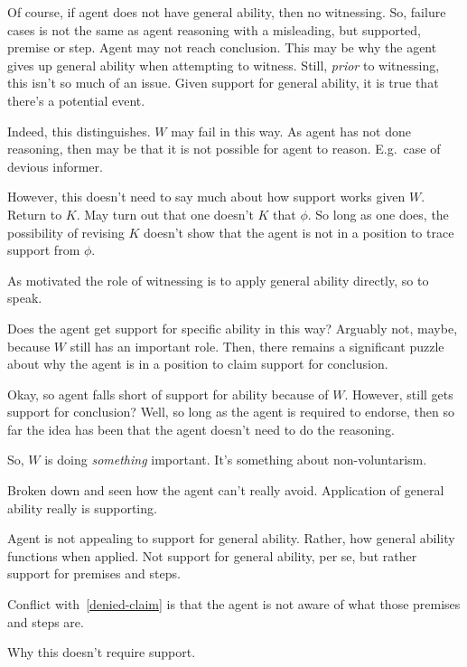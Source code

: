 \begin{note}[\(\geop{2}\)]
  Of course, if agent does not have general ability, then no witnessing.
  So, failure cases is not the same as agent reasoning with a misleading, but supported, premise or step.
  Agent may not reach conclusion.
  This may be why the agent gives up general ability when attempting to witness.
  Still, \emph{prior} to witnessing, this isn't so much of an issue.
  Given support for general ability, it is true that there's a potential event.

  Indeed, this distinguishes.
  \(W\) may fail in this way.
  As agent has not done reasoning, then may be that it is not possible for agent to reason.
  E.g.\ case of devious informer.

  However, this doesn't need to say much about how support works given \(W\).
  Return to \(K\).
  May turn out that one doesn't \(K\) that \(\phi\).
  So long as one does, the possibility of revising \(K\) doesn't show that the agent is not in a position to trace support from \(\phi\).

  {\color{red} As motivated} the role of witnessing is to apply general ability directly, so to speak.

  {
    \color{green}
    Does the agent get support for specific ability in this way?
    Arguably not, maybe, because \(W\) still has an important role.
    Then, there remains a significant puzzle about why the agent is in a position to claim support for conclusion.

    Okay, so agent falls short of support for ability because of \(W\).
    However, still gets support for conclusion?
    Well, so long as the agent is required to endorse, then so far the idea has been that the agent doesn't need to do the reasoning.

    So, \(W\) is doing \emph{something} important.
    It's something about non-voluntarism.

    Broken down and seen how the agent can't really avoid.
    Application of general ability really is supporting.
  }




  Agent is not appealing to support for general ability.
  Rather, how general ability functions when applied.
  Not support for general ability, per se, but rather support for premises and steps.

  Conflict with~\ref{denied-claim} is that the agent is not aware of what those premises and steps are.




  Why this doesn't require support.


\end{note}
